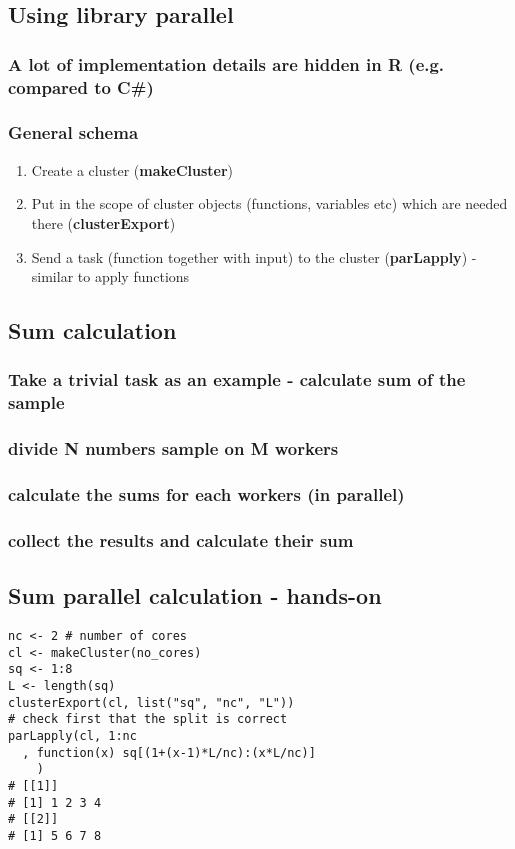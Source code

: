 \documentclass[bigger]{beamer}
\begin{document}
\subsection{Using library parallel}
\label{sec-3-3}
\subsubsection{A lot of implementation details are hidden in R (e.g. compared to C\#)}
\label{sec-3-3-1}
\subsubsection{General schema}
\label{sec-3-3-2}
\begin{enumerate}
\item Create a cluster (\textbf{makeCluster})
\label{sec-3-3-2-1}
\item Put in the scope of cluster objects (functions, variables etc) which are needed there (\textbf{clusterExport})
\label{sec-3-3-2-2}
\item Send a task (function together with input) to the cluster (\textbf{parLapply}) - similar to apply functions
\label{sec-3-3-2-3}
\end{enumerate}
\subsection{Sum calculation}
\label{sec-3-4}
\subsubsection{Take a trivial task as an example - calculate sum of the sample}
\label{sec-3-4-1}
\subsubsection{divide N numbers sample on M workers}
\label{sec-3-4-2}
\subsubsection{calculate the sums for each workers (in parallel)}
\label{sec-3-4-3}
\subsubsection{collect the results and calculate their sum}
\label{sec-3-4-4}
\subsection{Sum parallel calculation - hands-on}
\label{sec-3-5}
\begin{verbatim}
nc <- 2 # number of cores
cl <- makeCluster(no_cores)
sq <- 1:8
L <- length(sq)
clusterExport(cl, list("sq", "nc", "L"))
# check first that the split is correct
parLapply(cl, 1:nc
  , function(x) sq[(1+(x-1)*L/nc):(x*L/nc)]
	)
# [[1]] 
# [1] 1 2 3 4
# [[2]]
# [1] 5 6 7 8
\end{verbatim}
\end{document}
